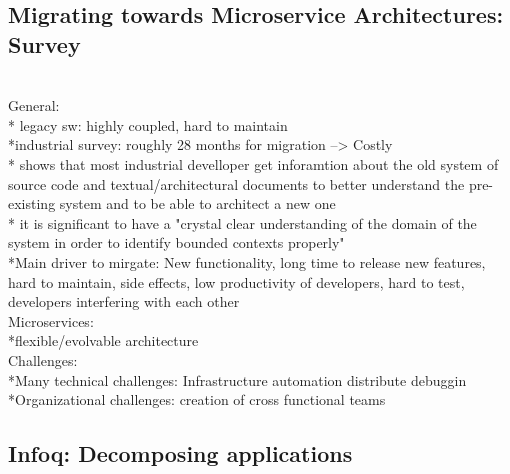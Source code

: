 \subsection{Migrating towards Microservice Architectures: Survey}
\cite{MigratingTowardsSurvey} \\

General:\\
* legacy sw: highly coupled, hard to maintain\\
*industrial survey: roughly 28 months for migration --> Costly\\
* shows that most industrial develloper get inforamtion about the old system of source code and textual/architectural documents to better understand the pre-existing system and to be able to architect a new one\\
* it is significant to have a "crystal clear understanding of the domain of the system in order to identify bounded contexts properly"\\
*Main driver to mirgate: New functionality, long time to release new features, hard to maintain, side effects, low productivity of developers, hard to test, developers interfering with each other\\


Microservices:\\
*flexible/evolvable architecture\\


Challenges:\\
*Many technical challenges: Infrastructure automation distribute debuggin\\
*Organizational challenges: creation of cross functional teams\\


\subsection{Infoq: Decomposing applications}
\cite{infoq} \\


